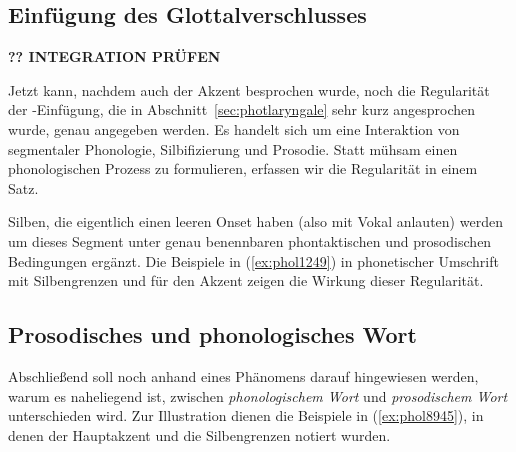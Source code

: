 \subsection{Einfügung des Glottalverschlusses}

\label{sec:glottalverschluss}

\textbf{?? INTEGRATION PRÜFEN}

Jetzt kann, nachdem auch der Akzent besprochen wurde, noch die Regularität der \textipa{[P]}-Einfügung, die in Abschnitt~\ref{sec:photlaryngale} sehr kurz angesprochen wurde, genau angegeben werden.
Es handelt sich um eine Interaktion von segmentaler Phonologie, Silbifizierung und Prosodie.
Statt mühsam einen phonologischen Prozess zu formulieren, erfassen wir die Regularität in einem Satz.


Silben, die eigentlich einen leeren Onset haben (also mit Vokal anlauten) werden um dieses Segment unter genau benennbaren phontaktischen und prosodischen Bedingungen ergänzt.
Die Beispiele in (\ref{ex:phol1249}) in phonetischer Umschrift mit Silbengrenzen und \textipa{[\textprimstress]} für den Akzent zeigen die Wirkung dieser Regularität.

\begin{exe}
  \ex\label{ex:phol1249}
  \begin{xlist}
  \end{xlist}
\end{exe}



\subsection{Prosodisches und phonologisches Wort}

\label{sec:prosphonwort}

Abschließend soll noch anhand eines Phänomens darauf hingewiesen werden, warum es naheliegend ist, zwischen \textit{phonologischem Wort} und \textit{prosodischem Wort} unterschieden wird.
Zur Illustration dienen die Beispiele in (\ref{ex:phol8945}), in denen der Hauptakzent und die Silbengrenzen notiert wurden.

